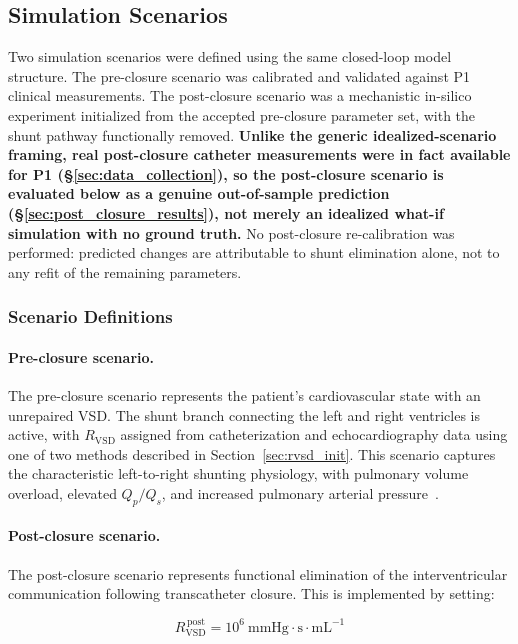 \documentclass{article}
\begin{document}
\subsection{Simulation Scenarios}
\label{sec:scenarios}

Two simulation scenarios were defined using the same closed-loop model
structure. The pre-closure scenario was calibrated and validated against
P1 clinical measurements. The post-closure scenario was a mechanistic
in-silico experiment initialized from the accepted pre-closure parameter
set, with the shunt pathway functionally removed. \textbf{Unlike the
generic idealized-scenario framing, real post-closure catheter
measurements were in fact available for P1 (\S\ref{sec:data_collection}),
so the post-closure scenario is evaluated below as a genuine out-of-sample
prediction (\S\ref{sec:post_closure_results}), not merely an idealized
what-if simulation with no ground truth.} No post-closure re-calibration
was performed: predicted changes are attributable to shunt elimination
alone, not to any refit of the remaining parameters.

\subsubsection{Scenario Definitions}
\label{sec:scenario_def}

\paragraph{Pre-closure scenario.}
The pre-closure scenario represents the patient's cardiovascular
state with an unrepaired VSD. The shunt branch connecting the left
and right ventricles is active, with $R_\mathrm{VSD}$ assigned
from catheterization and echocardiography data using one of two
methods described in Section~\ref{sec:rvsd_init}. This scenario
captures the characteristic left-to-right shunting physiology,
with pulmonary volume overload, elevated $Q_p/Q_s$, and increased
pulmonary arterial pressure~\cite{Ferrero2026Shunts,Colebank2026}.

\paragraph{Post-closure scenario.}
The post-closure scenario represents functional elimination of the
interventricular communication following transcatheter closure. This
is implemented by setting:

\begin{equation}
    R_\mathrm{VSD}^{\,\mathrm{post}} = 10^6\
    \mathrm{mmHg{\cdot}s{\cdot}mL^{-1}}
    \label{eq:rvsd_closed}
\end{equation}
\end{document}
